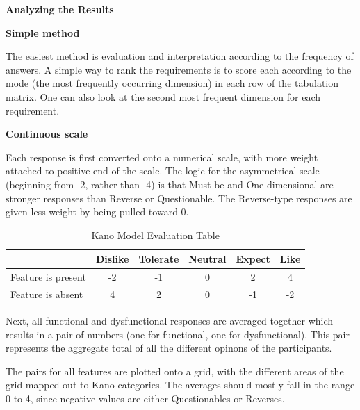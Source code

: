 \documentclass[../main.tex]{subfiles}
\begin{document}
\textbf{Analyzing the Results}

\textbf{Simple method}

The easiest method is evaluation and interpretation according to the frequency of answers. A simple way to rank the requirements is to score each according to the mode (the most frequently occurring dimension) in each row of the tabulation matrix. One can also look at the second most frequent dimension for each requirement. \cite{berger1993kano}

\textbf{Continuous scale}

 Each response is first converted onto a numerical scale, with more weight attached to positive end of the scale.  The logic for the asymmetrical scale 
(beginning from -2, rather than -4) is that Must-be and One-dimensional are stronger responses than Reverse or Questionable. The Reverse-type responses are given less weight by being pulled toward 0. 

\begin{table}[h]
    \centering
    \begin{tabular}{lccccc}
        \hline
        & Dislike & Tolerate & Neutral & Expect & Like \\
        \hline
        Feature is present & -2 & -1 & 0 & 2 & 4 \\
        Feature is absent  & 4  & 2  & 0 & -1 & -2 \\
        \hline
    \end{tabular}
    \caption{Kano Model Evaluation Table}
    \label{tab:kano}
\end{table}

Next, all functional and dysfunctional responses are averaged together which results in a pair of numbers (one for functional, one for dysfunctional). This pair represents the aggregate total of all the different opinons of the participants.

The pairs for all features are plotted onto a grid, with the different areas of the grid mapped out to Kano categories. The averages should mostly fall in the range 0 to 4, since negative values are either Questionables or Reverses.
\end{document}
